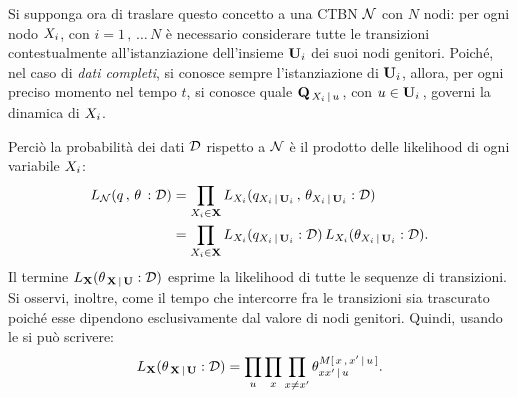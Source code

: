 Si supponga ora di traslare questo concetto a una \acl{CTBN} $\mathcal{N}$ con $N$ nodi: per ogni nodo $\mathnormal{X_i}$, con $i=1\,,\,\dotsc\,N$ è necessario considerare tutte le transizioni contestualmente all'istanziazione dell'insieme $\mathbf{U}_i$ dei suoi nodi genitori. Poiché, nel caso di \emph{dati completi}, si conosce sempre l'istanziazione di $\mathbf{U}_i$, allora, per ogni preciso momento nel tempo $t$, si conosce quale \im*{} $\mathbf{Q}_{\,\mathnormal{X_i}\,\arrowvert\,\mathnormal{u}}\,$, con $u\in\mathbf{U}_i\,$, governi la dinamica di $\mathnormal{X_i}$.

Perciò la probabilità dei dati $\mathcal{D}$ rispetto a $\mathcal{N}$ è il prodotto delle likelihood di ogni variabile $\mathnormal{X_i}$:
\begin{equation}
\begin{split}
L_{\mathcal{N}}(q\,,\,\theta\,:\mathcal{D})&=\prod_{\mathnormal{X_i}\in\mathbf{X}}L_{\mathnormal{X_i}}(q_{\mathnormal{X_i}\,\arrowvert\,\mathbf{U}_i}\,,\,\theta_{\mathnormal{X_i}\,\arrowvert\,\mathbf{U}_i}:\mathcal{D}) \\
&=\prod_{\mathnormal{X_i}\in\mathbf{X}}L_{\mathnormal{X_i}}(q_{\mathnormal{X_i}\,\arrowvert\,\mathbf{U}_i}:\mathcal{D})\,L_{\mathnormal{X_i}}(\theta_{\mathnormal{X_i}\,\arrowvert\,\mathbf{U}_i}:\mathcal{D})\text{.}
\end{split}
\end{equation}
Il termine $L_{\mathbf{X}}(\theta_{\,\mathbf{X}\,\arrowvert\,\mathbf{U}}:\mathcal{D})$ esprime la likelihood di tutte le sequenze di transizioni. Si osservi, inoltre, come il tempo che intercorre fra le transizioni sia trascurato poiché esse dipendono esclusivamente dal valore di nodi genitori. Quindi, usando le \emph{\stats{}} si può scrivere:
\[
L_{\set{X}}(\theta_{\,\set{X}\,\arrowvert\,\set{U}}:\conceptsym{D})=\prod_{u} \prod_{x} \prod_{x\neq x^{\prime}}\theta_{xx^{\prime}\,\arrowvert\,u}^{\mstat[x]{x^{\prime}\,\arrowvert\,u}}\text{.}
\]

